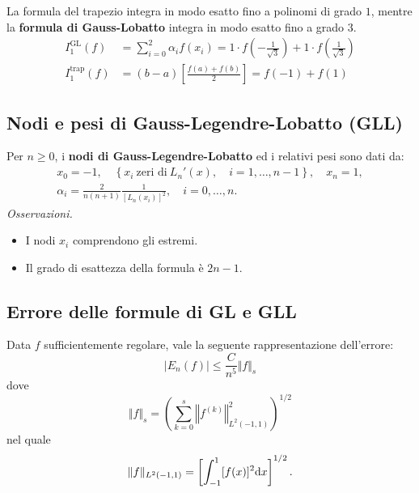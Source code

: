 La formula del trapezio integra in modo esatto fino a polinomi di grado $1$, mentre la \textbf{formula di Gauss-Lobatto} integra in modo esatto fino a grado $3$.
\begin{align*}
I^{\text{GL}}_{1}( f) & =\sum\limits ^{2}_{i=0} \alpha _{i} f( x_{i}) =1\cdot f\left( -\frac{1}{\sqrt{3}}\right) +1\cdot f\left(\frac{1}{\sqrt{3}}\right)\\
I^{\text{trap}}_{1}( f) & =( b-a)\left[\frac{f( a) +f( b)}{2}\right] =f( -1) +f( 1)
\end{align*}

\subsection{Nodi e pesi di Gauss-Legendre-Lobatto (GLL)}
Per $n\geqslant 0$, i \textbf{nodi di Gauss-Legendre-Lobatto} ed i relativi pesi sono dati da:
\begin{gather*}
x_{0} =-1,\quad \left\{x_{i} \ \text{zeri di} \ L_{n} '(x) ,\quad i=1,\dotsc ,n-1\right\} ,\quad x_{n} =1,\\
\alpha _{i} =\frac{2}{n( n+1)}\frac{1}{[ L_{n}( x_{i})]^{2}} ,\quad i=0,\dotsc ,n.
\end{gather*}
\textit{Osservazioni.}
\begin{itemize}
\item I nodi $x_{i}$ comprendono gli estremi.
\item Il grado di esattezza della formula è $2n-1$.
\end{itemize}

\subsection{Errore delle formule di GL e GLL}
Data $f$ sufficientemente regolare, vale la seguente rappresentazione dell'errore:
\begin{equation*}
| E_{n}(f)| \leqslant \frac{C}{n^{5}}\Vert f\Vert _{s}
\end{equation*}
dove
\begin{equation*}
\Vert f\Vert _{s} =\left(\sum\limits ^{s}_{k=0}\left\Vert f^{(k)}\right\Vert ^{2}_{L^{2}( -1,1)}\right)^{1/2}
\end{equation*}
nel quale
\begin{equation*}
\Vert f\Vert _{L^{2}( -1,1)} =\left[\int\nolimits ^{1}_{-1}[ f(x)]^{2} \mathrm d x\right]^{1/2} .
\end{equation*}

